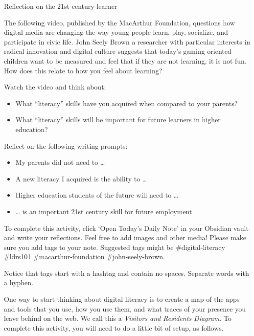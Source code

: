 \documentclass[
]{book}
\providecommand{\tightlist}{%
  \setlength{\itemsep}{0pt}\setlength{\parskip}{0pt}}
\theoremstyle{definition}
\theoremstyle{definition}
\theoremstyle{definition}
\theoremstyle{definition}
\theoremstyle{remark}
\begin{document}
\begin{reflect}
{Reflection on the 21st century learner}

The following video, published by the MacArthur Foundation, questions how digital media are changing the way young people learn, play, socialize, and participate in civic life. John Seely Brown a researcher with particular interests in radical innovation and digital culture suggests that today's gaming oriented children want to be measured and feel that if they are not learning, it is not fun. How does this relate to how you feel about learning?

Watch the video and think about:

\begin{itemize}
\tightlist
\item
  What ``literacy'' skills have you acquired when compared to your parents?\\
\item
  What ``literacy'' skills will be important for future learners in higher education?
\end{itemize}

Reflect on the following writing prompts:

\begin{itemize}
\tightlist
\item
  My parents did not need to \ldots{}\\
\item
  A new literacy I acquired is the ability to \ldots{}\\
\item
  Higher education students of the future will need to \ldots{}\\
\item
  \ldots{} is an important 21st century skill for future employment
\end{itemize}

To complete this activity, click `Open Today's Daily Note' in your Obsidian vault and write your reflections. Feel free to add images and other media! Please make sure you add tags to your note. Suggested tags might be \#digital-literacy \#ldrs101 \#macarthur-foundation \#john-seely-brown.

Notice that tags start with a hashtag and contain no spaces. Separate words with a hyphen.
\end{reflect}

One way to start thinking about digital literacy is to create a map of the apps and tools that you use, how you use them, and what traces of your presence you leave behind on the web. We call this a \emph{Visitors and Residents Diagram}. To complete this activity, you will need to do a little bit of setup, as follows.
\end{document}
